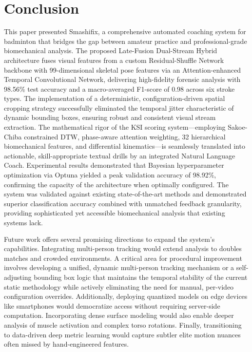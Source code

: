 \documentclass[pdflatex,sn-mathphys-num]{sn-jnl}
\theoremstyle{thmstyleone}%
\theoremstyle{thmstyletwo}%
\theoremstyle{thmstylethree}%
\begin{document}
\section{Conclusion}\label{sec6}
This paper presented Smashifix, a comprehensive automated coaching system for badminton that bridges the gap between amateur practice and professional-grade biomechanical analysis. The proposed Late-Fusion Dual-Stream Hybrid architecture fuses visual features from a custom Residual-Shuffle Network backbone with 99-dimensional skeletal pose features via an Attention-enhanced Temporal Convolutional Network, delivering high-fidelity forensic analysis with 98.56\% test accuracy and a macro-averaged F1-score of 0.98 across six stroke types. The implementation of a deterministic, configuration-driven spatial cropping strategy successfully eliminated the temporal jitter characteristic of dynamic bounding boxes, ensuring robust and consistent visual stream extraction. The mathematical rigor of the KSI scoring system---employing Sakoe-Chiba constrained DTW, phase-aware attention weighting, 32 hierarchical biomechanical features, and differential kinematics---is seamlessly translated into actionable, skill-appropriate textual drills by an integrated Natural Language Coach. Experimental results demonstrated that Bayesian hyperparameter optimization via Optuna yielded a peak validation accuracy of 98.92\%, confirming the capacity of the architecture when optimally configured. The system was validated against existing state-of-the-art methods and demonstrated superior classification accuracy combined with unmatched feedback granularity, providing sophisticated yet accessible biomechanical analysis that existing systems lack.

Future work offers several promising directions to expand the system's capabilities. Integrating multi-person tracking would extend analysis to doubles matches and crowded environments. A critical area for procedural improvement involves developing a unified, dynamic multi-person tracking mechanism or a self-adjusting bounding box logic that maintains the temporal stability of the current static methodology while actively eliminating the need for manual, per-video configuration overrides. Additionally, deploying quantized models on edge devices like smartphones would democratize access without requiring server-side computation. Incorporating dense surface modeling would also enable deeper analysis of muscle activation and complex torso rotations. Finally, transitioning to data-driven deep metric learning would capture subtler elite motion nuances often missed by hand-engineered features.
\backmatter
\end{document}
